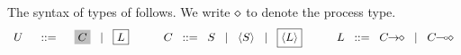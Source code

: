 \documentclass[runningheads]{llncs}
\begin{document}
{%


The syntax of types of \HOp follows. We write $\diamond$ to denote the process type.
\[
	\begin{array}{rcl}
		U & \bnfis &	\nonhosyntax{C} \bnfbar \nonpisyntax{L}
		\qquad \quad
		C  \bnfis		S \bnfbar \chtype{S} \bnfbar \nonpisyntax{\chtype{L}}
		\qquad \quad
		L \bnfis		\shot{C} \bnfbar \lhot{C}
		\\[1mm]


\end{array}\]}
\end{document}
